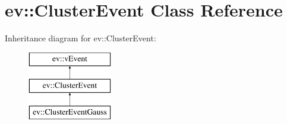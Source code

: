 \hypertarget{classev_1_1ClusterEvent}{}\section{ev\+:\+:Cluster\+Event Class Reference}
\label{classev_1_1ClusterEvent}
Inheritance diagram for ev\+:\+:Cluster\+Event\+:\begin{figure}[H]
\begin{center}
\leavevmode
\includegraphics[height=3.000000cm]{classev_1_1ClusterEvent}
\end{center}
\end{figure}
